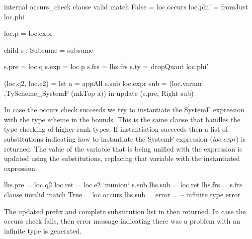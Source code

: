 \begin{code}
internal occurs_check
  clause valid
    match False = loc.occurs
    loc.phi' = fromJust loc.phi
    
    loc.p = loc.expr
    
    child s : Subsume = subsume
    
    s.pre  = loc.q
    s.exp  = loc.p
    s.frs  = lhs.frs
    s.ty   = dropQuant loc.phi'
    
    (loc.q2, loc.e2) =  let  a    = appAll s.sub loc.expr
                             sub  =  (loc.varnm
                                     ,TyScheme_SystemF (mkTop a))
                        in update (s.pre, Right sub)
\end{code}
In case the occurs check succeeds we try to instantiate the SystemF expression with the type scheme in the bounds. This is the same clause that handles the type checking of higher-rank types. If instantiation succeeds then a list of substitutions indicating how to instantiate the SystemF expression (\emph{loc.expr}) is returned.
The value of the variable that is being unified with the expression is updated using the substitutions, replacing that variable with the instantiated expression.

\begin{code}
  lhs.pre  = loc.q2
  loc.ret  = loc.e2 `munion` s.sub
  lhs.sub  = loc.ret
  lhs.frs  = s.frs  
clause invalid
  match True  = loc.occurs
  lhs.sub     = error ... -- infinite type error
\end{code}
The updated prefix and complete substitution list in then returned. In case the occurs check fails, then error message indicating there was a problem with an infinite type is generated.


